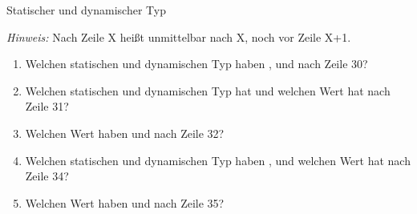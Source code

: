 \documentclass{../preamble}
\begin{document}
\begin{task}[credit = \stars{2}{3}]{Statischer und dynamischer Typ}
    
    \textit{Hinweis:} Nach Zeile X heißt unmittelbar nach X, noch vor Zeile X+1.
    \begin{enumerate}[label = (\arabic*)]
        \item Welchen statischen und dynamischen Typ haben ,  und  nach Zeile 30?
        \item Welchen statischen und dynamischen Typ hat  und welchen Wert hat  nach Zeile 31?
        \item Welchen Wert haben  und  nach Zeile 32?
        \item Welchen statischen und dynamischen Typ haben ,  und welchen Wert hat  nach Zeile 34?
        \item Welchen Wert haben  und  nach Zeile 35?
    \end{enumerate}

    \clearpage


\end{task}
\end{document}
